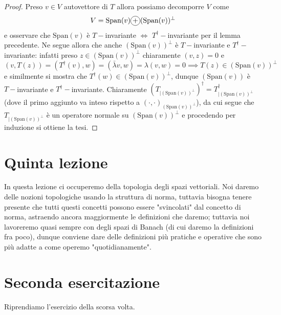 \documentclass[12pt, twoside, italian, openany]{book}
\begin{document}
	\begin{proof}
	Preso $v \in V$ autovettore di $T$ allora possiamo decomporre $V$ come
	$$
		V = \text{Span}(v) \circled{+} (\text{Span}(v))^\perp
	$$
	e osservare che $\text{Span}(v)$ è $T-$invariante $\iff$ $T^{\dag}-$invariante per il lemma precedente. Ne segue allora che anche $(\text{Span}(v))^{\perp}$ è $T-$invariante e $T^{\dag}-$invariante: infatti preso $z \in (\text{Span}(v))^\perp$ chiaramente $(v, z) = 0$ e
	$$
	(v, T(z)) = (T^{\dag}(v), w) = (\bar{\lambda}v, w) = \lambda(v, w) = 0 \implies T(z) \in (\text{Span}(v))^{\perp}
	$$
	e similmente si mostra che $T^{\dag}(w) \in (\text{Span}(v))^{\perp}$, dunque $(\text{Span}(v))$ è $T-$invariante e $T^{\dag}-$invariante. Chiaramente $(T_{|(\text{Span}(v))^\perp})^{\dag} = T^{\dag}_{|(\text{Span}(v))^\perp}$ (dove il primo aggiunto va inteso rispetto a $(\cdot, \cdot)_{(\text{Span}(v))^\perp}$), da cui segue che $T_{|(\text{Span}(v))^\perp}$ è un operatore normale su $(\text{Span}(v))^\perp$ e procedendo per induzione si ottiene la tesi.
	\end{proof}
	\chapter{Quinta lezione}
	In questa lezione ci occuperemo della topologia degli spazi vettoriali. Noi daremo delle nozioni topologiche usando la struttura di norma, tuttavia bisogna tenere presente che tutti questi concetti possono essere "svincolati" dal concetto di norma, astraendo ancora maggiormente le definizioni che daremo; tuttavia noi lavoreremo quasi sempre con degli spazi di Banach (di cui daremo la definizioni fra poco), dunque conviene dare delle definizioni più pratiche e operative 
	che sono più adatte a come operemo "quotidianamente".
	\chapter{Seconda esercitazione}

	Riprendiamo l'esercizio della scorsa volta.
\end{document}

